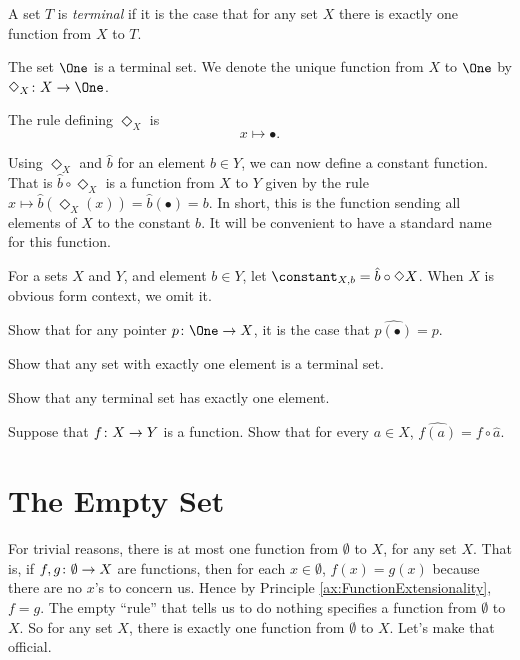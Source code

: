 \begin{defn}\label{def:terminal}
	A set $T$ is \emph{terminal} if it is the case that for any set $X$ there is exactly one function from $X$ to $T$.
\end{defn}

\begin{principle}
	The set $\One$ is a terminal set. 
	We denote the unique function from $X$ to $\One$ by $\fromto {\Diamond_X}{X}\One$.
	
	The rule defining $\Diamond_X$ is
	\[x\mapsto\bullet.\]
\end{principle}

Using $\Diamond_X$ and $\hat{b}$ for an element $b\in Y$, we can now define a constant function. 
That is $\hat{b}\circ\Diamond_X$ is a function from $X$ to $Y$ given by the rule
$x\mapsto \hat{b}(\Diamond_X(x))= \hat{b}(\bullet) = b$. 
In short, this is the function sending all elements of $X$ to the constant $b$. 
It will be convenient to have a standard name for this function.

\begin{defn}
	For a sets $X$ and $Y$, and element $b\in Y$, let $\constant_{X,b} = \hat b\circ \Diamond X$. When $X$ is obvious form context, we omit it.
\end{defn}

\begin{exercises}
	\begin{firstexercise}
		\item Show that for any pointer $\fromto p\One X$, it is the case that $\widehat{p(\bullet)}=p$.
		\item Show that any set with exactly one element is a terminal set.
		\item Show that any terminal set has exactly one element.
		\item Suppose that ${f}\colon{X}\to{Y}$ is a function. Show that for every $a\in X$, $\widehat{f(a)} = f\circ \hat{a}$.
	\end{firstexercise}
\end{exercises}

\section{The Empty Set}

For trivial reasons, there is at most one function from $\emptyset$ to $X$,
for any set $X$. That is,  if ${f,g}\colon{\emptyset}\to{X}$ are functions, then
for each $x\in\emptyset$, $f(x)=g(x)$ because there are no $x$'s to concern us. Hence by Principle \ref{ax:FunctionExtensionality}, $f=g$. The empty ``rule'' that tells us to do nothing specifies a function from $\emptyset$ to $X$. So for any set $X$, there is exactly one function from $\emptyset$ to $X$. Let's make that official.

